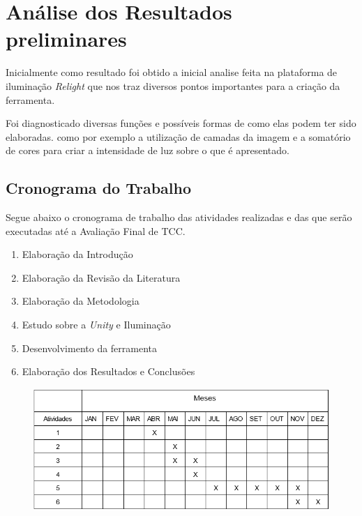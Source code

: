 \chapter{Análise dos Resultados preliminares}
\label{cap:04}
 Inicialmente como resultado foi obtido a inicial analise feita na plataforma de iluminação \textit{Relight} que nos traz diversos pontos importantes para a criação da ferramenta.

Foi diagnosticado diversas funções e possíveis formas de como elas podem ter sido elaboradas. como por exemplo a utilização de camadas da imagem e a somatório de cores para criar a intensidade de luz sobre o que é apresentado.

\section{Cronograma do Trabalho}

Segue abaixo o cronograma de trabalho das atividades realizadas e das que serão executadas até a Avaliação Final de TCC.

\begin{enumerate}
	\item Elaboração da Introdução
	\item Elaboração da Revisão da Literatura
	\item Elaboração da Metodologia
	\item Estudo sobre a \textit{Unity} e Iluminação
	\item Desenvolvimento da ferramenta
    \item Elaboração dos Resultados e Conclusões
\end{enumerate}

\FloatBarrier
\begin{figure}[!htbp]
	\centering
	\includegraphics[scale=0.6]{imagens/Cronograma.png}
\end{figure}
\FloatBarrier


